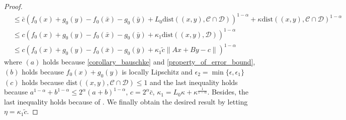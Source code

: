 \documentclass{article}
\numberwithin{equation}{section}
\begin{document}
\begin{proof}
\begin{align}
            & \overset{\mathop{(c)}}{\leq} \bar{c}(f_0(x)+g_0(y)-f_0(\bar{x})-g_0(\bar{y})+L_0\mathrm{dist}((x,y), \mathcal{C}\cap\mathcal{D}))^{1-\alpha}
            + \kappa \mathrm{dist}((x,y),\mathcal{C}\cap \mathcal{D})^{1-\alpha} \nonumber \\
            &\leq c(f_0(x)+g_0(y)-f_0(\bar{x})-g_0(\bar{y})+ \kappa_1\mathrm{dist}((x,y),\mathcal{D}))^{1-\alpha} \nonumber \\
            &\leq c(f_0(x)+g_0(y)-f_0(\bar{x})-g_0(\bar{y})+ \kappa_1\tilde{c}\|Ax+ By-c\rVert)^{1-\alpha} 
            \label{error_bound_f+g}
        \end{align} 
        where $(a)$ holds because \eqref{corollary_bauschke} and \eqref{property_of_error_bound}, $(b)$ holds because $f_0(x)+g_0(y)$ is locally Lipschitz and $\epsilon_2 = \min\{\epsilon, \epsilon_1\}$ 
        $(c)$ holds because $\mathrm{dist}((x,y),\mathcal{C}\cap \mathcal{D}) \leq 1$ and the last inequality holds because 
        $a^{1-\alpha}+ b^{1-\alpha} \leq 2^{\alpha} (a+b)^{1-\alpha}$, $c = 2^{\alpha}\bar{c}$, $\kappa_1 = L_0\kappa+\kappa^{\frac{1}{1-\alpha}}$. 
        Besides, the last inequality holds because of \cite[Lemma 3.2.3]{facchinei2003finite}. We finally 
        obtain the desired result by letting $\eta = \kappa_1\tilde{c}$. 
    \end{proof}
\end{document}
